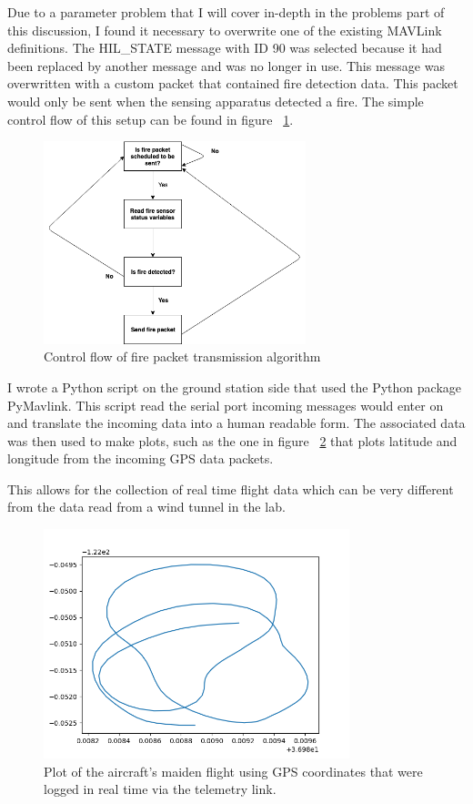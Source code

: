 \documentclass[12pt,journal,compsoc]{IEEEtran}
\begin{document}
Due to a parameter problem that I will cover in-depth in the problems part of this discussion, I found it necessary to overwrite one of the existing MAVLink definitions. The HIL\_STATE message with ID 90 was selected because it had been replaced by another message and was no longer in use. This message was overwritten with a custom packet that contained fire detection data. This packet would only be sent when the sensing apparatus detected a fire. The simple control flow of this setup can be found in figure ~\ref{sending}.

\begin{figure}[h!]
\hspace*{0cm}
\centering
\includegraphics[width=3in]{Sending.png}
\caption{Control flow of fire packet transmission algorithm}
\label{sending}
\end{figure}

I wrote a Python script on the ground station side that used the Python package PyMavlink. This script read the serial port incoming messages would enter on and translate the incoming data into a human readable form. The associated data was then used to make plots, such as the one in figure ~\ref{flyingGraph} that plots latitude and longitude from the incoming GPS data packets.

This allows for the collection of real time flight data which can be very different from the data read from a wind tunnel in the lab. 

\begin{figure}[h!]
\hspace*{0cm}
\centering
\includegraphics[width=3.5in]{flight02-22-2019_maiden.png}
\caption{Plot of the aircraft's maiden flight using GPS coordinates that were logged in real time via the telemetry link.}
\label{flyingGraph}
\end{figure}
\end{document}

